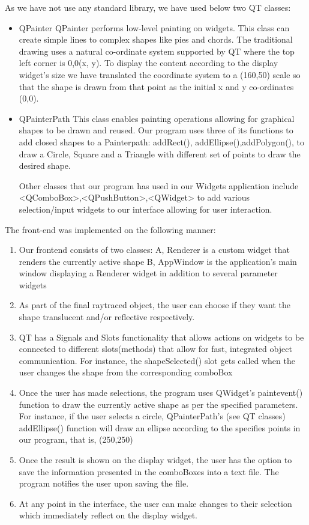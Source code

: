 \documentclass{article}
\begin{document}
As we have not use any standard library, we have used below two QT classes:
 \begin{itemize}
     \item QPainter \newline
     QPainter performs low-level painting on widgets. This class can create simple lines to complex shapes like pies and chords. The traditional drawing uses a natural co-ordinate system supported by QT where the top left corner is 0,0(x, y). To display the content according to the display widget’s size we have translated the coordinate system to a (160,50) scale so that the shape is drawn from that point as the initial x and y co-ordinates (0,0). 
     \item QPainterPath \newline
     This class enables painting operations allowing for graphical shapes to be drawn and reused. Our program uses three of its functions to add closed shapes to a Painterpath: addRect(), addEllipse(),addPolygon(), to draw a Circle, Square and a Triangle with different set of points to draw the desired shape.
     
Other classes that our program has used in our Widgets application include <QComboBox>,<QPushButton>,<QWidget> to add various selection/input widgets to our interface allowing for user interaction. 

 \end{itemize}
 
 The front-end was implemented on the following manner: 
 \begin{enumerate}
     \item	Our frontend consists of two classes:
A, Renderer is a custom widget that renders the currently active shape
B, AppWindow is the application’s main window displaying a Renderer widget in addition to several parameter widgets

\item	As part of the final raytraced object, the user can choose if they want the shape translucent and/or reflective respectively. 
\item	QT has a Signals and Slots functionality that allows actions on widgets to be connected to different slots(methods) that allow for fast, integrated object communication. For instance, the shapeSelected() slot gets called when the user changes the shape from the corresponding comboBox
\item	Once the user has made selections, the program uses QWidget’s paintevent() function to draw the currently active shape as per the specified parameters. For instance, if the user selects a circle, QPainterPath’s (see QT classes) addEllipse() function will draw an ellipse according to the specifies points in our program, that is, (250,250)
\item	Once the result is shown on the display widget, the user has the option to save the information presented in the comboBoxes into a text file. The program notifies the user upon saving the file.
\item	At any point in the interface, the user can make changes to their selection which immediately reflect on the display widget. 

 \end{enumerate}
 
\end{document}
